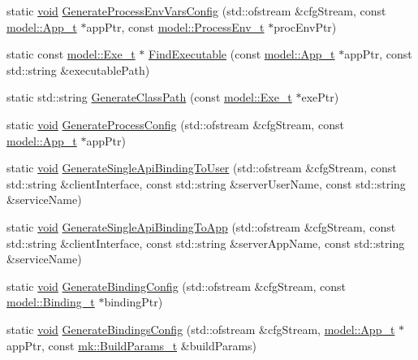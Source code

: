 \begin{DoxyCompactItemize}
\item 
static \hyperlink{_t_e_m_p_l_a_t_e__cdef_8h_ac9c84fa68bbad002983e35ce3663c686}{void} \hyperlink{namespaceconfig_ab94d1bcb3eb7aad8bb3f11297fcf07bd}{Generate\+Process\+Env\+Vars\+Config} (std\+::ofstream \&cfg\+Stream, const \hyperlink{structmodel_1_1_app__t}{model\+::\+App\+\_\+t} $\ast$app\+Ptr, const \hyperlink{structmodel_1_1_process_env__t}{model\+::\+Process\+Env\+\_\+t} $\ast$proc\+Env\+Ptr)
\item 
static const \hyperlink{structmodel_1_1_exe__t}{model\+::\+Exe\+\_\+t} $\ast$ \hyperlink{namespaceconfig_a883939f90e87d9062259859b04975a7e}{Find\+Executable} (const \hyperlink{structmodel_1_1_app__t}{model\+::\+App\+\_\+t} $\ast$app\+Ptr, const std\+::string \&executable\+Path)
\item 
static std\+::string \hyperlink{namespaceconfig_aba8d72596f16547b46dc9eb1353b7a0b}{Generate\+Class\+Path} (const \hyperlink{structmodel_1_1_exe__t}{model\+::\+Exe\+\_\+t} $\ast$exe\+Ptr)
\item 
static \hyperlink{_t_e_m_p_l_a_t_e__cdef_8h_ac9c84fa68bbad002983e35ce3663c686}{void} \hyperlink{namespaceconfig_adab4e3ce43a6bbaa2eea890f9280f09c}{Generate\+Process\+Config} (std\+::ofstream \&cfg\+Stream, const \hyperlink{structmodel_1_1_app__t}{model\+::\+App\+\_\+t} $\ast$app\+Ptr)
\item 
static \hyperlink{_t_e_m_p_l_a_t_e__cdef_8h_ac9c84fa68bbad002983e35ce3663c686}{void} \hyperlink{namespaceconfig_a1c30d5bfaa95a5deb645b66a98d15fa7}{Generate\+Single\+Api\+Binding\+To\+User} (std\+::ofstream \&cfg\+Stream, const std\+::string \&client\+Interface, const std\+::string \&server\+User\+Name, const std\+::string \&service\+Name)
\item 
static \hyperlink{_t_e_m_p_l_a_t_e__cdef_8h_ac9c84fa68bbad002983e35ce3663c686}{void} \hyperlink{namespaceconfig_a138a046b971484f4c0a3351c1b1a2c80}{Generate\+Single\+Api\+Binding\+To\+App} (std\+::ofstream \&cfg\+Stream, const std\+::string \&client\+Interface, const std\+::string \&server\+App\+Name, const std\+::string \&service\+Name)
\item 
static \hyperlink{_t_e_m_p_l_a_t_e__cdef_8h_ac9c84fa68bbad002983e35ce3663c686}{void} \hyperlink{namespaceconfig_a8a28722551daf2eb60efe74ff19136c6}{Generate\+Binding\+Config} (std\+::ofstream \&cfg\+Stream, const \hyperlink{structmodel_1_1_binding__t}{model\+::\+Binding\+\_\+t} $\ast$binding\+Ptr)
\item 
static \hyperlink{_t_e_m_p_l_a_t_e__cdef_8h_ac9c84fa68bbad002983e35ce3663c686}{void} \hyperlink{namespaceconfig_aa1fd25b92f4ca5d59fa10b777c63d4f4}{Generate\+Bindings\+Config} (std\+::ofstream \&cfg\+Stream, \hyperlink{structmodel_1_1_app__t}{model\+::\+App\+\_\+t} $\ast$app\+Ptr, const \hyperlink{structmk_1_1_build_params__t}{mk\+::\+Build\+Params\+\_\+t} \&build\+Params)

\end{DoxyCompactItemize}
